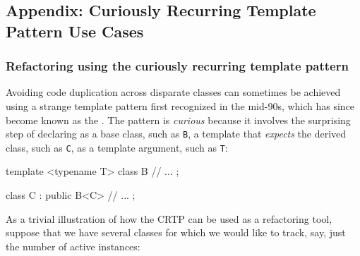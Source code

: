 \subsection[Appendix: Curiously Recurring Template Pattern Use Cases]{Appendix: Curiously Recurring Template Pattern Use Cases}\label{appendix:-crtp-use-cases}

\subsubsection[Refactoring using the curiously recurring template pattern]{Refactoring using the curiously recurring template pattern}\label{refactoring-using-the-curiously-recurring-template-pattern}

Avoiding code duplication across disparate classes can sometimes be
achieved using a strange template pattern first recognized in the
mid-90s, which has since become known as the . The pattern is \emph{curious} because it
involves the surprising step of declaring as a base class, such as
\lstinline!B!, a template that \emph{expects} the derived class, such as
\lstinline!C!, as a template argument, such as \lstinline!T!:

\begin{emcppslisting}
template <typename T>
class B
{
    // ...
};

class C : public B<C>
{
   // ...
};
\end{emcppslisting}

\noindent As a trivial illustration of how the CRTP can be used as a refactoring tool,
suppose that we have several classes for which we would like to track,
say, just the number of active instances:


